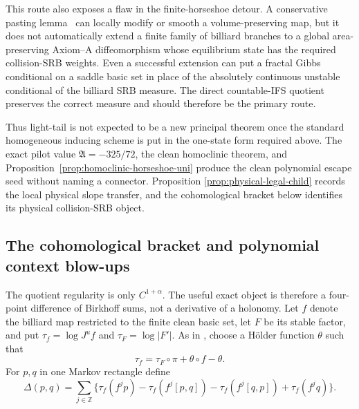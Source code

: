 \documentclass[11pt]{article}
\begin{document}
This route also exposes a flaw in the finite-horseshoe detour.  A conservative
pasting lemma~\cite{Teixeira} can locally modify or smooth a volume-preserving map, but it
does not automatically extend a finite family of billiard branches to a
global area-preserving Axiom--A diffeomorphism whose equilibrium state has the
required collision-SRB weights.  Even a successful extension can put a
fractal Gibbs conditional on a saddle basic set in place of the absolutely
continuous unstable conditional of the billiard SRB measure.  The direct
countable-IFS quotient preserves the correct measure and should therefore be
the primary route.

Thus light-tail is not expected to be a new principal theorem once the
standard homogeneous inducing scheme is put in the one-state form required
above.  The exact pilot value $\mathfrak A=-325/72$, the clean homoclinic
theorem, and
Proposition~\ref{prop:homoclinic-horseshoe-uni} produce the clean polynomial
escape seed without naming a connector.  Proposition
\ref{prop:physical-legal-child} records the local physical slope transfer, and
the cohomological bracket below identifies its physical collision-SRB object.

\subsection{The cohomological bracket and polynomial context blow-ups}

The quotient regularity is only $C^{1+\alpha}$.  The useful exact object is
therefore a four-point difference of Birkhoff sums, not a derivative of a
holonomy.  Let $f$ denote the billiard map restricted to the finite clean
basic set, let $F$ be its stable factor, and put
$\tau_f=\log J^uf$ and $\tau_F=\log|F'|$.  As in
\cite[Lemma~3.15]{Leclerc2026}, choose a H\"older function $\theta$ such that
\begin{equation}
\label{eq:potential-cohomology}
 \tau_f=\tau_F\circ\pi+\theta\circ f-\theta .
\end{equation}
For $p,q$ in one Markov rectangle define
\begin{equation}
\label{eq:physical-temporal-bracket}
 \Delta(p,q)=\sum_{j\in\mathbb Z}
 \{\tau_f(f^jp)-\tau_f(f^j[p,q])
   -\tau_f(f^j[q,p])+\tau_f(f^jq)\}.
\end{equation}
\end{document}
